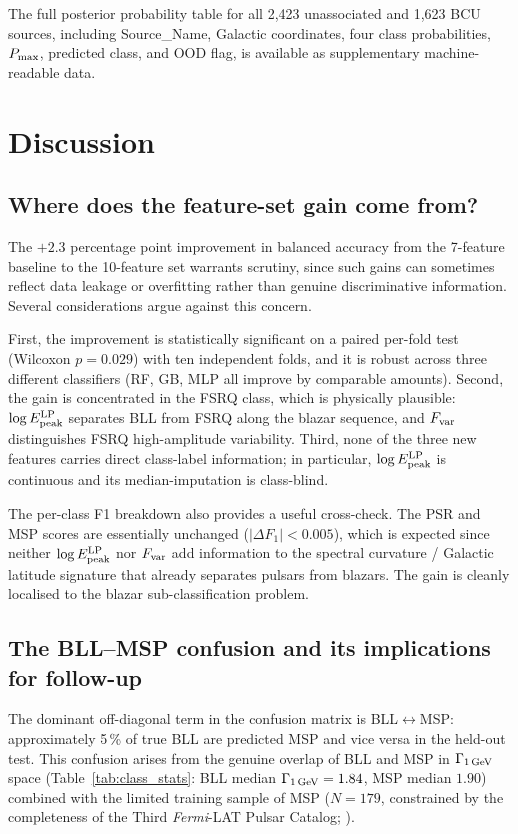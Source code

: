 \documentclass[fleqn,12pt]{article}
\newcommand{\fermi}{\textit{Fermi}-LAT}
\newcommand{\GamLP}{\Gamma_{\rm 1\,GeV}}
\newcommand{\Epeak}{E^{\rm LP}_{\rm peak}}
\newcommand{\Fvar}{F_{\rm var}}
\begin{document}
The full posterior probability table for all 2,423 unassociated
and 1,623 BCU sources, including Source\_Name, Galactic coordinates,
four class probabilities, $P_{\rm max}$, predicted class, and OOD
flag, is available as supplementary machine-readable data.

\section{Discussion}
\label{sec:disc}

\subsection{Where does the feature-set gain come from?}
\label{ssec:disc_feat}

The $+2.3$ percentage point improvement in balanced accuracy from
the 7-feature baseline to the 10-feature set warrants scrutiny, since
such gains can sometimes reflect data leakage or overfitting rather
than genuine discriminative information. Several considerations argue
against this concern.

First, the improvement is statistically significant on a paired
per-fold test (Wilcoxon $p = 0.029$) with ten independent folds,
and it is robust across three different classifiers (RF, GB, MLP all
improve by comparable amounts). Second, the gain is concentrated in
the FSRQ class, which is physically plausible: $\log\Epeak$ separates
BLL from FSRQ along the blazar sequence, and $\Fvar$ distinguishes
FSRQ high-amplitude variability. Third, none of the three new features
carries direct class-label information; in particular, $\log\Epeak$
is continuous and its median-imputation is class-blind.

The per-class F1 breakdown also provides a useful cross-check. The
PSR and MSP scores are essentially unchanged ($|\Delta F_1| < 0.005$),
which is expected since neither $\log\Epeak$ nor $\Fvar$ add
information to the spectral curvature / Galactic latitude signature
that already separates pulsars from blazars. The gain is cleanly
localised to the blazar sub-classification problem.

\subsection{The BLL--MSP confusion and its implications for follow-up}
\label{ssec:disc_confusion}

The dominant off-diagonal term in the confusion matrix is
BLL$\leftrightarrow$MSP: approximately 5\,\% of true BLL are
predicted MSP and vice versa in the held-out test. This confusion
arises from the genuine overlap of BLL and MSP in $\GamLP$ space
(Table~\ref{tab:class_stats}: BLL median $\GamLP = 1.84$, MSP median
$1.90$) combined with the limited training sample of MSP
($N = 179$, constrained by the completeness of the Third \fermi{}
Pulsar Catalog; \citealt{Smith2023}).
\end{document}

